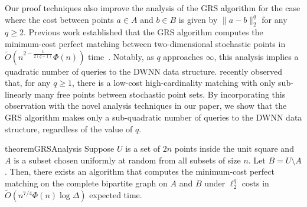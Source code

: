  



Our proof techniques also improve the analysis of the GRS algorithm for the case where the cost between points $a \in A$ and $b \in B$ is given by $\|a-b\|_2^q$ for any $q \ge 2$. Previous work established that the GRS algorithm computes the minimum-cost perfect matching between two-dimensional stochastic points in $\tilde{O}(n^{2-\frac{1}{2(q+1)}}\Phi(n))$ time~\cite{gattani2023robust}. Notably, as $q$ approaches $\infty$, this analysis implies a quadratic number of queries to the DWNN data structure.
\citet{raghvendra2024new} recently observed that, for any $q\ge1$, there is a low-cost high-cardinality matching with only sub-linearly many free points between stochastic point sets. By incorporating this observation with the novel analysis techniques in our paper, we show that the GRS algorithm makes only a sub-quadratic number of queries to the DWNN data structure, regardless of the value of $q$. 
  

\begin{restatable}{theorem}{GRSAnalysis}\label{lemma:GRS-analysis}
    Suppose $U$ is a set of $2n$ points inside the unit square and $A$ is a subset chosen uniformly at random from all subsets of size $n$. Let $B=U\setminus A$.  Then, there exists an algorithm that computes the minimum-cost perfect matching on the complete bipartite graph on $A$ and $B$ under $\ell_2^q$ costs in $\tilde{O}(n^{7/4}\Phi(n)\log \Delta)$ expected time.
\end{restatable}


